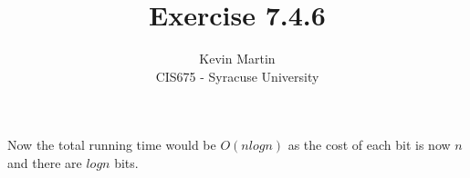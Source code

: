 \documentclass{article}
\author{Kevin Martin\\ CIS675 - Syracuse University}
\title{Exercise 7.4.6}
\begin{document}
\maketitle
Now the total running time would be $O(nlogn)$ as the cost of each bit is now $n$
and there are $log n$ bits.
\end{document}
